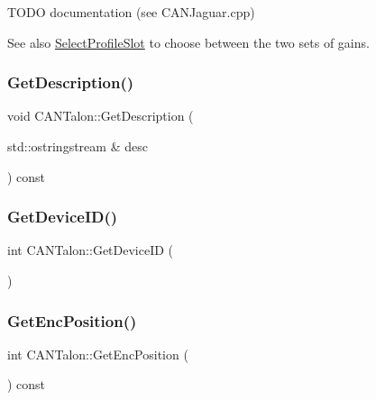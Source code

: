 T\+O\+DO documentation (see C\+A\+N\+Jaguar.\+cpp) \begin{DoxySeeAlso}{See also}
\hyperlink{class_c_a_n_talon_a0f478462884ed5e541179821c44b724f}{Select\+Profile\+Slot} to choose between the two sets of gains. 
\end{DoxySeeAlso}
\mbox{\label{class_c_a_n_talon_af5fcf549829342563fc9bcb60760fafd}} 
\subsubsection{\texorpdfstring{Get\+Description()}{GetDescription()}}
{\footnotesize\ttfamily void C\+A\+N\+Talon\+::\+Get\+Description (\begin{DoxyParamCaption}\item[{std\+::ostringstream \&}]{desc }\end{DoxyParamCaption}) const\hspace{0.3cm}{\ttfamily [override]}}

\mbox{\label{class_c_a_n_talon_a68641c5f1b7ae5ca4683d8ad3521c275}} 
\subsubsection{\texorpdfstring{Get\+Device\+I\+D()}{GetDeviceID()}}
{\footnotesize\ttfamily int C\+A\+N\+Talon\+::\+Get\+Device\+ID (\begin{DoxyParamCaption}{ }\end{DoxyParamCaption})}

\mbox{\label{class_c_a_n_talon_a9ccad36fcf60791617bae9bb0f1443b4}} 
\subsubsection{\texorpdfstring{Get\+Enc\+Position()}{GetEncPosition()}}
{\footnotesize\ttfamily int C\+A\+N\+Talon\+::\+Get\+Enc\+Position (\begin{DoxyParamCaption}{ }\end{DoxyParamCaption}) const\hspace{0.3cm}{\ttfamily [virtual]}}

